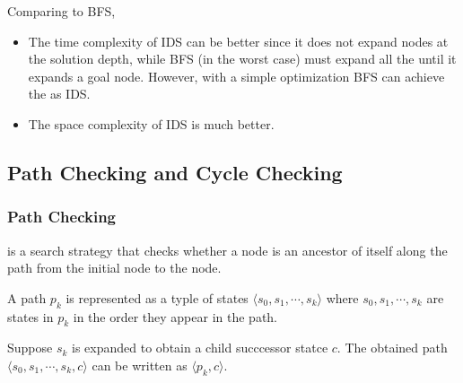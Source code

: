 \begin{remark}
    Comparing to BFS, 

    \begin{itemize}
        \item The {\color{darkGreen}time complexity} of IDS can be better since it does not expand nodes at the solution depth, while BFS (in the worst case) must expand all the  until it expands a goal node. However, with a simple optimization BFS can achieve the  as IDS.

        \item The {\color{darkGreen}space complexity} of IDS is much better.
    \end{itemize}
\end{remark}

\subsection{Path Checking and Cycle Checking}

\subsubsection{Path Checking}

\begin{definition}\label{def:path-checking}
     is a search strategy that checks whether a node is an ancestor of itself along the path from the initial node to the node.
\end{definition}

\begin{remark}[Notation]
    \begin{listu}
        \item A path $p_k$ is represented as a typle of states $\langle s_0, s_1, \cdots, s_k \rangle$ where $s_0, s_1, \cdots, s_k$ are states in $p_k$ in the order they appear in the path.
        \item Suppose $s_k$ is expanded to obtain a child succcessor statce $c$. The obtained path $\langle s_0, s_1, \cdots, s_k, c \rangle$ can be written as $\langle p_k, c \rangle$.
    \end{listu}
\end{remark}

